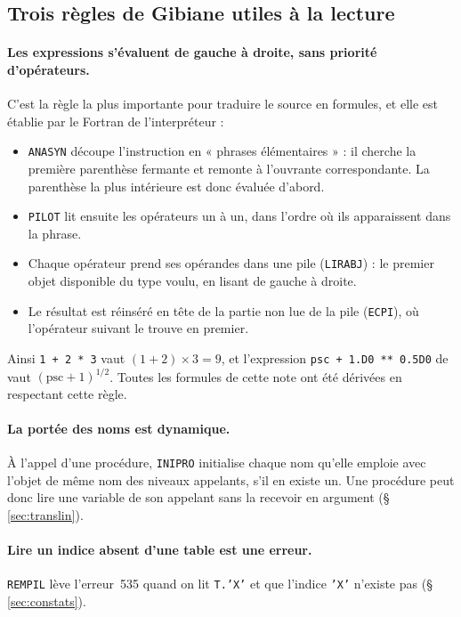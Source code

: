 \subsection{Trois règles de Gibiane utiles à la lecture}
\label{sec:gibiane}

\paragraph{Les expressions s'évaluent de gauche à droite, sans priorité d'opérateurs.}
C'est la règle la plus importante pour traduire le source en formules, et elle est établie par le Fortran de l'interpréteur :
\begin{itemize}
\item \texttt{ANASYN} découpe l'instruction en « phrases élémentaires » : il cherche la première parenthèse fermante et remonte à l'ouvrante correspondante. La parenthèse la plus intérieure est donc évaluée d'abord.
\item \texttt{PILOT} lit ensuite les opérateurs un à un, dans l'ordre où ils apparaissent dans la phrase.
\item Chaque opérateur prend ses opérandes dans une pile (\texttt{LIRABJ}) : le premier objet disponible du type voulu, en lisant de gauche à droite.
\item Le résultat est réinséré en tête de la partie non lue de la pile (\texttt{ECPI}), où l'opérateur suivant le trouve en premier.
\end{itemize}
Ainsi \texttt{1 + 2 * 3} vaut $(1+2)\times 3 = 9$, et l'expression \texttt{psc + 1.D0 ** 0.5D0} de  vaut $(\mathrm{psc}+1)^{1/2}$.
Toutes les formules de cette note ont été dérivées en respectant cette règle.

\paragraph{La portée des noms est dynamique.}
À l'appel d'une procédure, \texttt{INIPRO} initialise chaque nom qu'elle emploie avec l'objet de même nom des niveaux appelants, s'il en existe un.
Une procédure peut donc lire une variable de son appelant sans la recevoir en argument (§ \ref{sec:translin}).

\paragraph{Lire un indice absent d'une table est une erreur.}
\texttt{REMPIL} lève l'erreur~535 quand on lit \texttt{T.'X'} et que l'indice \texttt{'X'} n'existe pas (§ \ref{sec:constats}).


